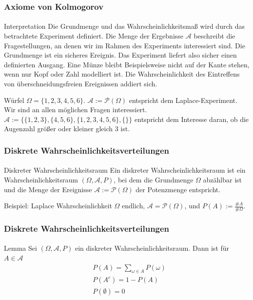 \documentclass{beamer}
\begin{document}
\begin{frame}
    \frametitle{Axiome von Kolmogorov}
\framesubtitle{}

\begin{block}{Interpretation}
Die Grundmenge und das Wahrscheinlichkeitsmaß wird durch das betrachtete Experiment definiert. Die Menge der Ergebnisse  $\mathcal{A}$ beschreibt die Fragestellungen, an denen wir im Rahmen des Experiments interessiert sind.
Die Grundmenge ist ein sicheres Ereignis. Das Experiment liefert also sicher einen definierten Ausgang. Eine Münze bleibt Beispielsweise nicht auf der Kante stehen, wenn nur Kopf oder Zahl modelliert ist. Die Wahrscheinlichkeit des Eintreffens von  überschneidungsfreien Ereignissen addiert sich.
\end{block}


\begin{block}{Würfel}
$\Omega = \{1,2,3,4,5,6 \}$.  $\mathcal{A} :=  \mathcal{P}(\Omega)$ entspricht dem Laplace-Experiment. Wir sind an allen möglichen Fragen interessiert.
$\mathcal{A} := \{  \{ 1,2,3\}, \{4,5,6 \}, \{ 1,2,3,4,5,6 \}, \{\}   \} $ entspricht dem Interesse daran, ob die Augenzahl größer oder kleiner gleich 3 ist.
\end{block}

 \end{frame}





\begin{frame}
    \frametitle{Diskrete Wahrscheinlichkeitsverteilungen}
\framesubtitle{}
\begin{block}{Diskreter Wahrscheinlichkeitsraum}
Ein diskreter Wahrscheinlichkeitsraum ist ein Wahrscheinlichkeitsraum $(\Omega, \mathcal{A}, P)$, bei dem die Grundmenge $\Omega$ abzählbar ist und die Menge der Ereignisse $\mathcal{A} := \mathcal{P}(\Omega)$ der Potenzmenge entspricht.
\end{block}
\begin{block}{Beispiel: Laplace Wahrscheinlichkeit}
$\Omega$ endlich, $ \mathcal{A} = \mathcal{P}(\Omega)$,  und $P(A) := \frac{\#A}{\#\Omega}$.
\end{block}

 \end{frame}



\begin{frame}
    \frametitle{Diskrete Wahrscheinlichkeitsverteilungen}
\framesubtitle{}

\begin{block}{Lemma}
Sei $(\Omega, \mathcal{A}, P)$ ein diskreter Wahrscheinlichkeitsraum. Dann ist für $A \in \mathcal{A}$ 
\begin{align*}
& P(A) = \sum_{\omega \in A} P( \omega ) \\
& P(A^c) = 1 - P(A) \\
& P(\emptyset) = 0
\end{align*}

\end{block}

 \end{frame}
\end{document}

